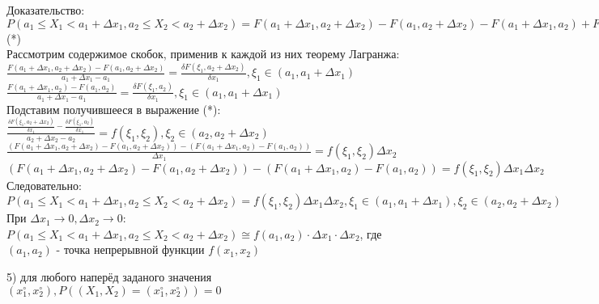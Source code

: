 Доказательство:\\
$P(a_{1} \leqslant X_{1} < a_{1} + \Delta x_{1}, a_{2} \leqslant X_{2} < a_{2} + \Delta x_{2}) =  F(a_{1} + \Delta x_{1}, a_{2} + \Delta x_{2}) - F(a_{1}, a_{2} + \Delta x_{2}) - F(a_{1} + \Delta x_{1}, a_{2}) + F(a_{1}, a_{2}) = (F(a_{1} + \Delta x_{1}, a_{2} + \Delta x_{2}) - (F(a_{1}, a_{2} + \Delta x_{2})) - F(a_{1} + \Delta x_{1}, a_{2}) - F(a_{1}, a_{2}))$ (*)\\
Рассмотрим содержимое скобок, применив к каждой из них теорему Лагранжа:\\
$\frac{F(a_{1} + \Delta x_{1}, a_{2} + \Delta x_{2}) - F(a_{1}, a_{2} + \Delta x_{2})}{a_{1} + \Delta x_{1} - a_{1}} = \frac{\delta F(\xi_{1}, a_{2} + \Delta x_{2})}{\delta x_{1}}, \xi_{1} \in (a_{1}, a_{1} + \Delta x_{1})$\\
$\frac{F(a_{1} + \Delta x_{1}, a_{2}) - F(a_{1}, a_{2})}{a_{1} + \Delta x_{1} - a_{1}} = \frac{\delta F(\xi_{1}, a_{2})}{\delta x_{1}}, \xi_{1} \in (a_{1}, a_{1} + \Delta x_{1})$\\
Подставим получившееся в выражение (*):\\
$\frac{\frac{\delta F(\xi_{1}, a_{2} + \Delta x_{2})}{\delta x_{1}} - \frac{\delta F(\xi_{1}, a_{2})}{\delta x_{1}}}{a_{2} + \Delta x_{2} - a_{2}} = f(\xi_{1}, \xi_{2}), \xi_{2} \in (a_{2}, a_{2} + \Delta x_{2})$\\
$\frac{(F(a_{1} + \Delta x_{1}, a_{2} + \Delta x_{2}) - F(a_{1}, a_{2} + \Delta x_{2})) - (F(a_{1} + \Delta x_{1}, a_{2}) - F(a_{1}, a_{2}))}{\Delta x_{1}}  = f(\xi_{1}, \xi_{2}) \Delta x_{2}$\\
$(F(a_{1} + \Delta x_{1}, a_{2} + \Delta x_{2}) - F(a_{1}, a_{2} + \Delta x_{2})) - (F(a_{1} + \Delta x_{1}, a_{2}) - F(a_{1}, a_{2})) = f(\xi_{1}, \xi_{2})\Delta x_{1}  \Delta x_{2}$\\
Следовательно:\\
$P(a_{1} \leqslant X_{1} < a_{1} + \Delta x_{1}, a_{2} \leqslant X_{2} < a_{2} + \Delta x_{2}) =  f(\xi_{1}, \xi_{2})\Delta x_{1}  \Delta x_{2}, \xi_{1} \in (a_{1}, a_{1} + \Delta x_{1}), \xi_{2} \in (a_{2}, a_{2} + \Delta x_{2})$\\
При $\Delta x_{1} \rightarrow 0, \Delta x_{2} \rightarrow 0$:\\
$P(a_{1} \leqslant X_{1} < a_{1} + \Delta x_{1}, a_{2} \leqslant X_{2} < a_{2} + \Delta x_{2}) \cong f(a_{1}, a_{2}) \cdot \Delta x_{1} \cdot \Delta x_{2}$, где $(a_{1}, a_{2})$ - точка непрерывной функции $f(x_{1}, x_{2})$

5) для любого наперёд заданого значения $(x_{1}^{\circ}, x_{2}^{\circ}), P((X_{1}, X_{2}) = (x_{1}^{\circ}, x_{2}^{\circ})) = 0$\\

